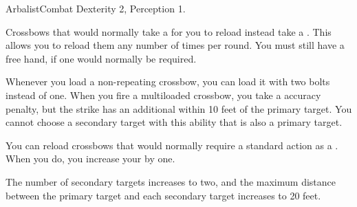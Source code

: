     \begin{feat}{Arbalist}{Combat}
        \featpre Dexterity 2, Perception 1.

         Crossbows that would normally take a  for you to reload instead take a .
        This allows you to reload them any number of times per round.
        You must still have a free hand, if one would normally be required.

         Whenever you load a non-repeating crossbow, you can load it with two bolts instead of one.
        When you fire a multiloaded crossbow, you take a  accuracy penalty, but the strike has an additional  within 10 feet of the primary target.
        You cannot choose a secondary target with this ability that is also a primary target.

         You can reload crossbows that would normally require a standard action as a .
        When you do, you increase your  by one.

         The number of secondary targets increases to two, and the maximum distance between the primary target and each secondary target increases to 20 feet.
    \end{feat}

